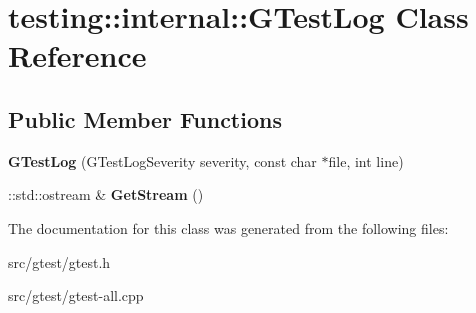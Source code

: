 \hypertarget{classtesting_1_1internal_1_1_g_test_log}{}\section{testing\+:\+:internal\+:\+:G\+Test\+Log Class Reference}
\label{classtesting_1_1internal_1_1_g_test_log}
\subsection*{Public Member Functions}
\begin{DoxyCompactItemize}
\item 
\mbox{\label{classtesting_1_1internal_1_1_g_test_log_a364691bf972983a59cfa2891062a64af}} 
{\bfseries G\+Test\+Log} (G\+Test\+Log\+Severity severity, const char $\ast$file, int line)
\item 
\mbox{\label{classtesting_1_1internal_1_1_g_test_log_aebb92e67d98eca69f0347d5121dab27a}} 
\+::std\+::ostream \& {\bfseries Get\+Stream} ()
\end{DoxyCompactItemize}


The documentation for this class was generated from the following files\+:\begin{DoxyCompactItemize}
\item 
src/gtest/gtest.\+h\item 
src/gtest/gtest-\/all.\+cpp\end{DoxyCompactItemize}
